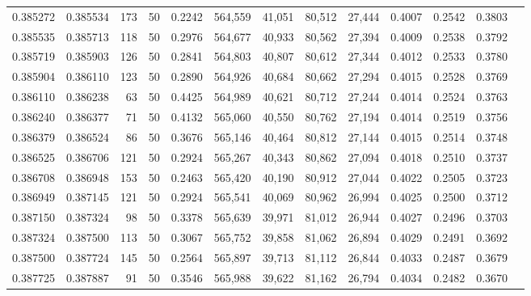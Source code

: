 \begin{tabular}{rrrrrrrrrrrrr}
0.385272 & 0.385534 &   173 &  50 &                                     0.2242 & 564,559 &  41,051 &  80,512 &  27,444 & 0.4007 & 0.2542 & 0.3803 \\
0.385535 & 0.385713 &   118 &  50 &                                     0.2976 & 564,677 &  40,933 &  80,562 &  27,394 & 0.4009 & 0.2538 & 0.3792 \\
0.385719 & 0.385903 &   126 &  50 &                                     0.2841 & 564,803 &  40,807 &  80,612 &  27,344 & 0.4012 & 0.2533 & 0.3780 \\
0.385904 & 0.386110 &   123 &  50 &                                     0.2890 & 564,926 &  40,684 &  80,662 &  27,294 & 0.4015 & 0.2528 & 0.3769 \\
0.386110 & 0.386238 &    63 &  50 &                                     0.4425 & 564,989 &  40,621 &  80,712 &  27,244 & 0.4014 & 0.2524 & 0.3763 \\
0.386240 & 0.386377 &    71 &  50 &                                     0.4132 & 565,060 &  40,550 &  80,762 &  27,194 & 0.4014 & 0.2519 & 0.3756 \\
0.386379 & 0.386524 &    86 &  50 &                                     0.3676 & 565,146 &  40,464 &  80,812 &  27,144 & 0.4015 & 0.2514 & 0.3748 \\
0.386525 & 0.386706 &   121 &  50 &                                     0.2924 & 565,267 &  40,343 &  80,862 &  27,094 & 0.4018 & 0.2510 & 0.3737 \\
0.386708 & 0.386948 &   153 &  50 &                                     0.2463 & 565,420 &  40,190 &  80,912 &  27,044 & 0.4022 & 0.2505 & 0.3723 \\
0.386949 & 0.387145 &   121 &  50 &                                     0.2924 & 565,541 &  40,069 &  80,962 &  26,994 & 0.4025 & 0.2500 & 0.3712 \\
0.387150 & 0.387324 &    98 &  50 &                                     0.3378 & 565,639 &  39,971 &  81,012 &  26,944 & 0.4027 & 0.2496 & 0.3703 \\
0.387324 & 0.387500 &   113 &  50 &                                     0.3067 & 565,752 &  39,858 &  81,062 &  26,894 & 0.4029 & 0.2491 & 0.3692 \\
0.387500 & 0.387724 &   145 &  50 &                                     0.2564 & 565,897 &  39,713 &  81,112 &  26,844 & 0.4033 & 0.2487 & 0.3679 \\
0.387725 & 0.387887 &    91 &  50 &                                     0.3546 & 565,988 &  39,622 &  81,162 &  26,794 & 0.4034 & 0.2482 & 0.3670 \\

\end{tabular}
